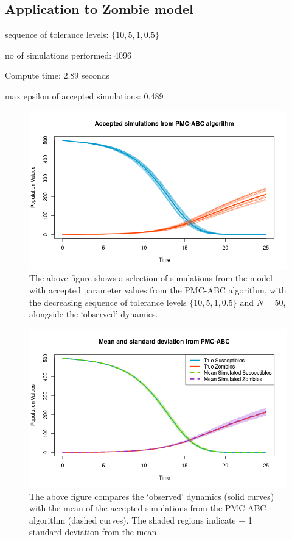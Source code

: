 \documentclass[]{article}
\begin{document}
\subsection{Application to Zombie model}


sequence of tolerance levels: $\{ 10, 5, 1, 0.5\}$

no of simulations performed: 4096

Compute time: 2.89 seconds

max epsilon of accepted simulations: 0.489

\begin{figure}[H]
	\centering
	\includegraphics[width=0.8\linewidth]{../Figures/PMC-ABC_simulations}
	\caption{The above figure shows a selection of simulations from the model with accepted parameter values from the PMC-ABC algorithm, with the decreasing sequence of tolerance levels $\{ 10, 5, 1, 0.5\}$ and $N=50$, alongside the `observed' dynamics.}
	\label{pmc_abc_acc_simulations}
\end{figure}

\begin{figure}[H]
	\centering
	\includegraphics[width=0.8\linewidth]{../Figures/PMC_ABC_sd_bands}
	\caption{The above figure compares the `observed' dynamics (solid curves) with the mean of the accepted simulations from the PMC-ABC algorithm (dashed curves). The shaded regions indicate $\pm$ 1 standard deviation from the mean.}
	\label{pmc_abc_sd}
\end{figure}
\end{document}

